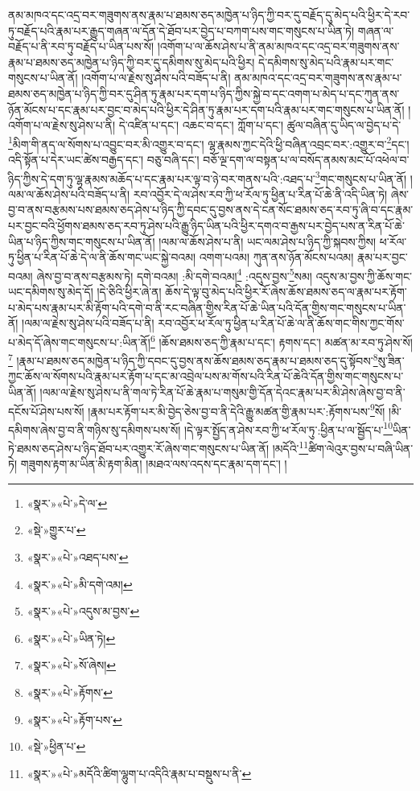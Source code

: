 ནམ་མཁའ་དང་འདྲ་བར་གཟུགས་ནས་རྣམ་པ་ཐམས་ཅད་མཁྱེན་པ་ཉིད་ཀྱི་བར་དུ་བརྗོད་དུ་མེད་པའི་ཕྱིར་དེ་རབ་ཏུ་བརྗོད་པའི་རྣམ་པར་རྒྱུད་གཞན་ལ་དོན་དེ་ཐོབ་པར་བྱེད་པ་བཀག་པས་གང་གསུངས་པ་ཡིན་ཏེ། གཞན་ལ་བརྗོད་པ་ནི་རབ་ཏུ་བརྗོད་པ་ཡིན་པས་སོ། །འགོག་པ་ལ་ཆོས་ཤེས་པ་ནི་ནམ་མཁའ་དང་འདྲ་བར་གཟུགས་ནས་རྣམ་པ་ཐམས་ཅད་མཁྱེན་པ་ཉིད་ཀྱི་བར་དུ་དམིགས་སུ་མེད་པའི་ཕྱིར། དེ་དམིགས་སུ་མེད་པའི་རྣམ་པར་གང་གསུངས་པ་ཡིན་ནོ། །འགོག་པ་ལ་རྗེས་སུ་ཤེས་པའི་བཟོད་པ་ནི། ནམ་མཁའ་དང་འདྲ་བར་གཟུགས་ནས་རྣམ་པ་ཐམས་ཅད་མཁྱེན་པ་ཉིད་ཀྱི་བར་དུ་ཤིན་ཏུ་རྣམ་པར་དག་པ་ཉིད་ཀྱིས་སྐྱེ་བ་དང་འགག་པ་མེད་པ་དང་ཀུན་ནས་ཉོན་མོངས་པ་དང་རྣམ་པར་བྱང་བ་མེད་པའི་ཕྱིར་དེ་ཤིན་ཏུ་རྣམ་པར་དག་པའི་རྣམ་པར་གང་གསུངས་པ་ཡིན་ནོ། །འགོག་པ་ལ་རྗེས་སུ་ཤེས་པ་ནི། དེ་འཛིན་པ་དང་། འཆང་བ་དང་། ཀློག་པ་དང་། ཚུལ་བཞིན་དུ་ཡིད་ལ་བྱེད་པ་དེ་\footnote{«སྣར་»«པེ་»དེ་ལ་}མིག་གི་ནད་ལ་སོགས་པ་འབྱུང་བར་མི་འགྱུར་བ་དང་། ལྷ་རྣམས་ཀྱང་དེའི་ཕྱི་བཞིན་འབྲང་བར་:འགྱུར་བ་\footnote{«སྡེ་»གྱུར་པ་}དང་། འདི་སྟོན་པ་དེར་ཡང་ཚེས་བརྒྱད་དང་། བཅུ་བཞི་དང་། བཅོ་ལྔ་དག་ལ་བསྟན་པ་ལ་བསོད་ནམས་མང་པོ་འཕེལ་བ་ཉིད་ཀྱིས་དེ་དག་ཏུ་ལྷ་རྣམས་མཆོད་པ་དང་རྣམ་པར་ལྟ་བ་ཉེ་བར་གནས་པའི་:འཐད་པ་\footnote{«སྣར་»«པེ་»འཐད་པས་}གང་གསུངས་པ་ཡིན་ནོ། །ལམ་ལ་ཆོས་ཤེས་པའི་བཟོད་པ་ནི། རབ་འབྱོར་དེ་ལ་ཤེས་རབ་ཀྱི་ཕ་རོལ་ཏུ་ཕྱིན་པ་རིན་པོ་ཆེ་ནི་འདི་ཡིན་ཏེ། ཞེས་བྱ་བ་ནས་བརྩམས་པས་ཐམས་ཅད་ཤེས་པ་ཉིད་ཀྱི་དབང་དུ་བྱས་ནས་དེ་ངན་སོང་ཐམས་ཅད་རབ་ཏུ་ཞི་བ་དང་རྣམ་པར་བྱང་བའི་ཕྱོགས་ཐམས་ཅད་རབ་ཏུ་ཤེས་པའི་རྒྱུ་ཉིད་ཡིན་པའི་ཕྱིར་དགའ་བ་རྒྱས་པར་བྱེད་པས་ན་རིན་པོ་ཆེ་ཡིན་པ་ཉིད་ཀྱིས་གང་གསུངས་པ་ཡིན་ནོ། །ལམ་ལ་ཆོས་ཤེས་པ་ནི། ཡང་ལམ་ཤེས་པ་ཉིད་ཀྱི་སྐབས་ཀྱིས། ཕ་རོལ་ཏུ་ཕྱིན་པ་རིན་པོ་ཆེ་དེ་ལ་ནི་ཆོས་གང་ཡང་སྐྱེ་བའམ། འགག་པའམ། ཀུན་ནས་ཉོན་མོངས་པའམ། རྣམ་པར་བྱང་བའམ། ཞེས་བྱ་བ་ནས་བརྩམས་ཏེ། དགེ་བའམ། :མི་དགེ་བའམ།\footnote{«སྣར་»«པེ་»མི་དགེ་འམ།} :འདུས་བྱས་\footnote{«སྣར་»«པེ་»འདུས་མ་བྱས་}སམ། འདུས་མ་བྱས་ཀྱི་ཆོས་གང་ཡང་དམིགས་སུ་མེད་དོ། །དེ་ཅིའི་ཕྱིར་ཞེ་ན། ཆོས་དེ་ལྟ་བུ་མེད་པའི་ཕྱིར་རོ་ཞེས་ཆོས་ཐམས་ཅད་ལ་རྣམ་པར་རྟོག་པ་མེད་པས་རྣམ་པར་མི་རྟོག་པའི་དགེ་བ་ནི་རང་བཞིན་གྱིས་རིན་པོ་ཆེ་ཡིན་པའི་དོན་གྱིས་གང་གསུངས་པ་ཡིན་ནོ། །ལམ་ལ་རྗེས་སུ་ཤེས་པའི་བཟོད་པ་ནི། རབ་འབྱོར་ཕ་རོལ་ཏུ་ཕྱིན་པ་རིན་པོ་ཆེ་ལ་ནི་ཆོས་གང་གིས་ཀྱང་གོས་པ་མེད་དོ་ཞེས་གང་གསུངས་པ་:ཡིན་ནོ།\footnote{«སྣར་»«པེ་»ཡིན་ཏེ།} །ཆོས་ཐམས་ཅད་ཀྱི་རྣམ་པ་དང་། རྟགས་དང་། མཚན་མ་རབ་ཏུ་ཤེས་སོ།\footnote{«སྣར་»«པེ་»སོ་ཞེས།} །རྣམ་པ་ཐམས་ཅད་མཁྱེན་པ་ཉིད་ཀྱི་དབང་དུ་བྱས་ནས་ཆོས་ཐམས་ཅད་རྣམ་པ་ཐམས་ཅད་དུ་སྟོབས་\footnote{«སྣར་»«པེ་»རྟོགས་}སུ་ཟིན་ཀྱང་ཆོས་ལ་སོགས་པའི་རྣམ་པར་རྟོག་པ་དང་མ་འབྲེལ་པས་མ་གོས་པའི་རིན་པོ་ཆེའི་དོན་གྱིས་གང་གསུངས་པ་ཡིན་ནོ། །ལམ་ལ་རྗེས་སུ་ཤེས་པ་ནི་གལ་ཏེ་རིན་པོ་ཆེ་རྣམ་པ་གསུམ་གྱི་དོན་དེའང་རྣམ་པར་མི་ཤེས་ཞེས་བྱ་བ་ནི་དངོས་པོ་ཤེས་པས་སོ། །རྣམ་པར་རྟོག་པར་མི་བྱེད་ཅེས་བྱ་བ་ནི་དེའི་རྒྱུ་མཚན་གྱི་རྣམ་པར་:རྟོགས་པས་\footnote{«སྣར་»«པེ་»རྟོག་པས་}སོ། །མི་དམིགས་ཞེས་བྱ་བ་ནི་གཉིས་སུ་དམིགས་པས་སོ། །དེ་ལྟར་སྤྱོད་ན་ཤེས་རབ་ཀྱི་ཕ་རོལ་ཏུ་:ཕྱིན་པ་ལ་སྦྱོད་པ་\footnote{«སྡེ་»ཕྱིན་པ་}ཡིན་ཏེ་ཐམས་ཅད་ཤེས་པ་ཉིད་ཐོབ་པར་འགྱུར་རོ་ཞེས་གང་གསུངས་པ་ཡིན་ནོ། །མདོའི་\footnote{«སྣར་»«པེ་»མདོའི་ཚིག་ལྷུག་པ་འདིའི་རྣམ་པ་བསྡུས་པ་ནི་}ཚིག་ལེའུར་བྱས་པ་བཞི་ཡིན་ཏེ། གཟུགས་རྟག་མ་ཡིན་མི་རྟག་མིན། །མཐའ་ལས་འདས་དང་རྣམ་དག་དང་། །

